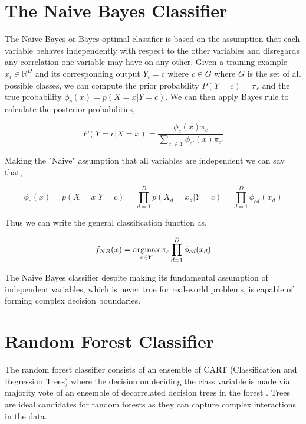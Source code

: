 \documentclass[proposal]{umassthesis}
\begin{document}
{\section{The Naive Bayes Classifier }

The Naive Bayes or Bayes optimal classifier \cite{zhang2004optimality} is based on the assumption that each variable behaves independently with respect to the other variables and disregards any correlation one variable may have on any other. Given a training example $x_i \in \mathbb{R}^D$ and its corresponding output $Y_i = c$ where $c \in G$ where $G$ is the set of all possible classes, we can compute the prior probability $P(Y = c) = \pi_c$ and the true probability $\phi_c(x) = p(X = x | Y = c)$.  We can then apply Bayes rule to calculate the posterior probabilities,

\begin{equation}
P(Y = c | X = x) = \dfrac{\phi_c(x) \pi_c}{\sum_{c' \in Y}\phi_{c'}(x) \pi_{c'}}
\end{equation}

Making the "Naive" assumption that all variables are independent we can say that,

\begin{equation}
\phi_c(x) = p(X = x | Y = c) = \prod_{d=1}^{D} p(X_d = x_d | Y = c) = \prod_{d=1}^{D}\phi_{cd}(x_d)
\end{equation}

Thus we can write the general classification function as,

\begin{equation}
f_{NB}(x) = \operatornamewithlimits{argmax}\limits_{c \in Y} \pi_c \prod_{d = 1}^{D} \phi_{cd}(x_d)
\end{equation}

The Naive Bayes classifier despite making its fundamental assumption of independent variables, which is never true for real-world problems, is capable of forming complex decision boundaries.

\section{Random Forest Classifier}

The random forest classifier consists of an ensemble of CART (Classification and Regression Trees) where the decision on deciding the class variable is made via majority vote of an ensemble of decorrelated decision trees in the forest \cite{breiman2001random}. Trees are ideal candidates for random forests as they can capture complex interactions in the data.

}
\end{document}
